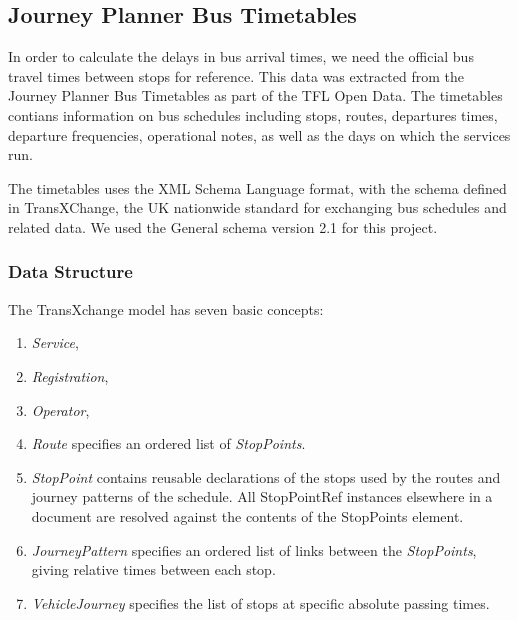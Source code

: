 \subsection{Journey Planner Bus Timetables}
In order to calculate the delays in bus arrival times, we need the official bus travel times between stops for reference. This data was extracted from the Journey Planner Bus Timetables\cite{open_data_feeds_description} as part of the TFL Open Data. The timetables contians information on bus schedules including stops, routes, departures times, departure frequencies, operational notes, as well as the days on which the services run.

The timetables uses the XML Schema Language\cite{xml} format, with the schema defined in TransXChange\cite{transxchange}, the UK nationwide standard for exchanging bus schedules and related data. We used the General schema version 2.1\cite{transxchange_downloads_and_schema}\cite{transxchange_schema_2.1_xsd} for this project.

\subsubsection{Data Structure}
The TransXchange model has seven basic concepts\cite{transxchange_schema_guide}:
\begin{enumerate}
  \item \textit{Service},
  \item \textit{Registration},
  \item \textit{Operator},
  \item \textit{Route} specifies an ordered list of \textit{StopPoints}.
  \item \textit{StopPoint} contains reusable declarations of the stops used by the routes and journey patterns of the schedule. All StopPointRef instances elsewhere in a document are resolved against the contents of the StopPoints element.
  \item \textit{JourneyPattern} specifies an ordered list of links between the \textit{StopPoints}, giving
relative times between each stop.
  \item \textit{VehicleJourney} specifies the list of stops at specific absolute passing times.
\end{enumerate}

